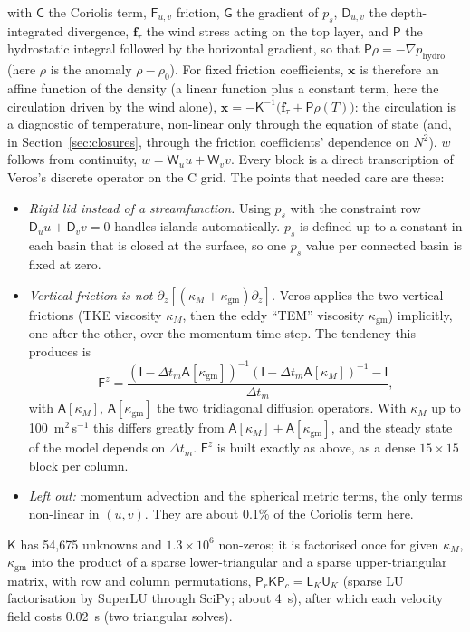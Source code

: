 \documentclass{article}
\begin{document}
with $\mathsf{C}$ the Coriolis term, $\mathsf{F}_{u,v}$ friction, $\mathsf{G}$ the gradient of $p_s$, $\mathsf{D}_{u,v}$ the depth-integrated divergence, $\mathbf{f}_\tau$ the wind stress acting on the top layer, and $\mathsf{P}$ the hydrostatic integral followed by the horizontal gradient, so that $\mathsf{P}\rho = -\nabla p_\text{hydro}$ (here $\rho$ is the anomaly $\rho-\rho_0$). For fixed friction coefficients, $\mathbf{x}$ is therefore an affine function of the density (a linear function plus a constant term, here the circulation driven by the wind alone), $\mathbf{x} = -\mathsf{K}^{-1}\big(\mathbf{f}_\tau + \mathsf{P}\rho(T)\big)$: the circulation is a diagnostic of temperature, non-linear only through the equation of state (and, in Section~\ref{sec:closures}, through the friction coefficients' dependence on $N^2$). $w$ follows from continuity, $w = \mathsf{W}_u u + \mathsf{W}_v v$. Every block is a direct transcription of Veros's discrete operator on the C grid. The points that needed care are these:
\begin{itemize}
\item \emph{Rigid lid instead of a streamfunction.} Using $p_s$ with the constraint row $\mathsf{D}_u u + \mathsf{D}_v v=0$ handles islands automatically. $p_s$ is defined up to a constant in each basin that is closed at the surface, so one $p_s$ value per connected basin is fixed at zero.
\item \emph{Vertical friction is not $\partial_z[(\kappa_M+\kappa_\text{gm})\partial_z]$.} Veros applies the two vertical frictions (TKE viscosity $\kappa_M$, then the eddy ``TEM'' viscosity $\kappa_\text{gm}$) implicitly, one after the other, over the momentum time step. The tendency this produces is
\[
\mathsf{F}^z = \frac{(\mathsf{I} - \Delta t_m\mathsf{A}[\kappa_\text{gm}])^{-1}(\mathsf{I} - \Delta t_m\mathsf{A}[\kappa_M])^{-1} - \mathsf{I}}{\Delta t_m},
\]
with $\mathsf{A}[\kappa_M]$, $\mathsf{A}[\kappa_\text{gm}]$ the two tridiagonal diffusion operators. With $\kappa_M$ up to 100~m$^2$\,s$^{-1}$ this differs greatly from $\mathsf{A}[\kappa_M]+\mathsf{A}[\kappa_\text{gm}]$, and the steady state of the model depends on $\Delta t_m$. $\mathsf{F}^z$ is built exactly as above, as a dense $15\times15$ block per column.
\item \emph{Left out:} momentum advection and the spherical metric terms, the only terms non-linear in $(u,v)$. They are about 0.1\% of the Coriolis term here.
\end{itemize}
$\mathsf{K}$ has 54{,}675 unknowns and $1.3\times10^{6}$ non-zeros; it is factorised once for given $\kappa_M$, $\kappa_\text{gm}$ into the product of a sparse lower-triangular and a sparse upper-triangular matrix, with row and column permutations, $\mathsf{P}_r\mathsf{K}\mathsf{P}_c = \mathsf{L}_K\mathsf{U}_K$ (sparse LU factorisation by SuperLU through SciPy; about 4~s), after which each velocity field costs 0.02~s (two triangular solves).
\end{document}
